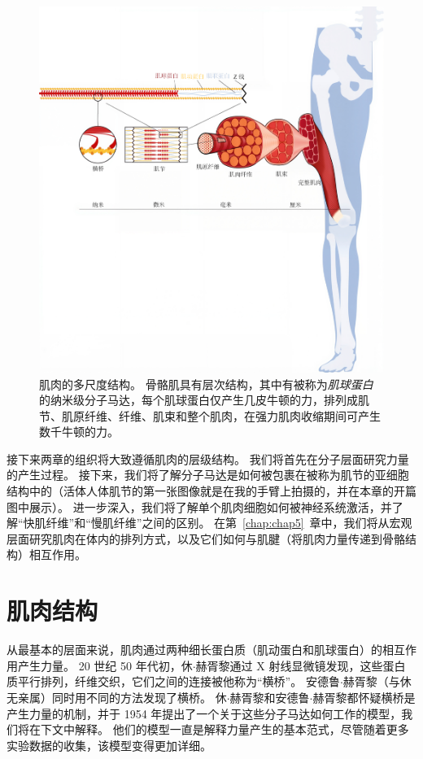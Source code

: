 \begin{figure}[!htb]
	\centering
	\includegraphics[width=1.0\linewidth]{chap4/4_2}
	\caption{肌肉的多尺度结构。
		骨骼肌具有层次结构，其中有被称为\textit{肌球蛋白}的纳米级分子马达，每个肌球蛋白仅产生几皮牛顿的力，排列成肌节、肌原纤维、纤维、肌束和整个肌肉，在强力肌肉收缩期间可产生数千牛顿的力。 \label{fig:4_2}}
\end{figure}


接下来两章的组织将大致遵循肌肉的层级结构。
我们将首先在分子层面研究力量的产生过程。
接下来，我们将了解分子马达是如何被包裹在被称为肌节的亚细胞结构中的（活体人体肌节的第一张图像就是在我的手臂上拍摄的，并在本章的开篇图中展示）。
进一步深入，我们将了解单个肌肉细胞如何被神经系统激活，并了解“快肌纤维”和“慢肌纤维”之间的区别。
在第~\ref{chap:chap5}~章中，我们将从宏观层面研究肌肉在体内的排列方式，以及它们如何与肌腱（将肌肉力量传递到骨骼结构）相互作用。


\section{肌肉结构}

从最基本的层面来说，肌肉通过两种细长蛋白质（肌动蛋白和肌球蛋白）的相互作用产生力量。
20 世纪 50 年代初，休$\cdot$赫胥黎通过 X 射线显微镜发现，这些蛋白质平行排列，纤维交织，它们之间的连接被他称为“横桥”。
安德鲁$\cdot$赫胥黎（与休无亲属）同时用不同的方法发现了横桥。
休$\cdot$赫胥黎和安德鲁$\cdot$赫胥黎都怀疑横桥是产生力量的机制，并于 1954 年提出了一个关于这些分子马达如何工作的模型，我们将在下文中解释。
他们的模型一直是解释力量产生的基本范式，尽管随着更多实验数据的收集，该模型变得更加详细。


